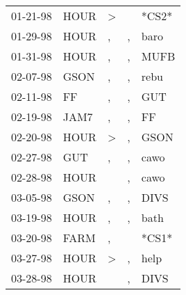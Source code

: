 \begin{supertabular}{p{0.07\textwidth}p{0.06\textwidth}p{0.02\textwidth}p{0.02\textwidth}p{0.06\textwidth}}
          01-21-98\textsuperscript{} &           HOUR\textsuperscript{} &     \textgreater &                  &                            *CS2* \\
          01-29-98\textsuperscript{} &           HOUR\textsuperscript{} &                , &                , &           baro\textsuperscript{} \\
          01-31-98\textsuperscript{} &           HOUR\textsuperscript{} &                , &                , &           MUFB\textsuperscript{} \\
          02-07-98\textsuperscript{} &           GSON\textsuperscript{} &                , &                , &           rebu\textsuperscript{} \\
          02-11-98\textsuperscript{} &             FF\textsuperscript{} &                , &                , &            GUT\textsuperscript{} \\
          02-19-98\textsuperscript{} &           JAM7\textsuperscript{} &                , &                , &             FF\textsuperscript{} \\
          02-20-98\textsuperscript{} &           HOUR\textsuperscript{} &     \textgreater &                , &           GSON\textsuperscript{} \\
          02-27-98\textsuperscript{} &            GUT\textsuperscript{} &                , &                , &           cawo\textsuperscript{} \\
          02-28-98\textsuperscript{} &           HOUR\textsuperscript{} &                  &                , &           cawo\textsuperscript{} \\
          03-05-98\textsuperscript{} &           GSON\textsuperscript{} &                , &                , &           DIVS\textsuperscript{} \\
          03-19-98\textsuperscript{} &           HOUR\textsuperscript{} &                , &                , &           bath\textsuperscript{} \\
          03-20-98\textsuperscript{} &           FARM\textsuperscript{} &                , &                  &                            *CS1* \\
          03-27-98\textsuperscript{} &           HOUR\textsuperscript{} &     \textgreater &                , &           help\textsuperscript{} \\
          03-28-98\textsuperscript{} &           HOUR\textsuperscript{} &                  &                , &           DIVS\textsuperscript{} \\

\end{supertabular}
